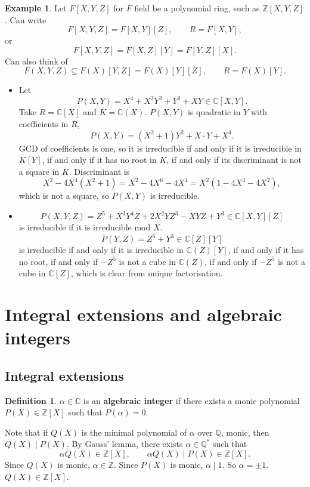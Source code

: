 \documentclass{article}
\newcommand{\Z}{\mathbb{Z}}
\newcommand{\Q}{\mathbb{Q}}
\newcommand{\C}{\mathbb{C}}
\newcommand{\rb}[1]{\left( #1 \right)}
\renewcommand{\sb}[1]{\left[ #1 \right]}
\theoremstyle{definition}\newtheorem{definition}{Definition}[subsection]
\theoremstyle{definition}\newtheorem{remark}[definition]{Remark}
\theoremstyle{definition}\newtheorem*{example}{Example}
\theoremstyle{definition}\newtheorem*{note}{Note}
\begin{document}
\begin{example}
Let $ F\sb{X, Y, Z} $ for $ F $ field be a polynomial ring, such as $ \Z\sb{X, Y, Z} $. Can write
$$ F\sb{X, Y, Z} = F\sb{X, Y}\sb{Z}, \qquad R = F\sb{X, Y}, $$
or
$$ F\sb{X, Y, Z} = F\sb{X, Z}\sb{Y} = F\sb{Y, Z}\sb{X}. $$
Can also think of
$$ F\rb{X, Y, Z} \subseteq F\rb{X}\sb{Y, Z} = F\rb{X}\sb{Y}\sb{Z}, \qquad R = F\rb{X}\sb{Y}. $$
\begin{itemize}
\item Let
$$ P\rb{X, Y} = X^4 + X^2Y^2 + Y^2 + XY \in \C\sb{X, Y}. $$
Take $ R = \C\sb{X} $ and $ K = \C\rb{X} $. $ P\rb{X, Y} $ is quadratic in $ Y $ with coefficients in $ R $,
$$ P\rb{X, Y} = \rb{X^2 + 1}Y^2 + X \cdot Y + X^4. $$
GCD of coefficients is one, so it is irreducible if and only if it is irreducible in $ K\sb{Y} $, if and only if it has no root in $ K $, if and only if its discriminant is not a square in $ K $. Discriminant is
$$ X^2 - 4X^4\rb{X^2 + 1} = X^2 - 4X^6 - 4X^4 = X^2\rb{1 - 4X^4 - 4X^2}, $$
which is not a square, so $ P\rb{X, Y} $ is irreducible.
\item $$ P\rb{X, Y, Z} = Z^5 + X^3Y^4Z + 2X^2YZ^3 - XYZ + Y^3 \in \C\sb{X, Y}\sb{Z} $$
is irreducible if it is irreducible mod $ X $.
$$ \overline{P}\rb{Y, Z} = Z^5 + Y^3 \in \C\sb{Z}\sb{Y} $$
is irreducible if and only if it is irreducible in $ \C\rb{Z}\sb{Y} $, if and only if it has no root, if and only if $ -Z^5 $ is not a cube in $ \C\rb{Z} $, if and only if $ -Z^5 $ is not a cube in $ \C\sb{Z} $, which is clear from unique factorisation.
\end{itemize}
\end{example}

\pagebreak

\section{Integral extensions and algebraic integers}

\subsection{Integral extensions}

\begin{definition}
$ \alpha \in \C $ is an \textbf{algebraic integer} if there exists a monic polynomial $ P\rb{X} \in \Z\sb{X} $ such that $ P\rb{\alpha} = 0 $.
\end{definition}

Note that if $ Q\rb{X} $ is the minimal polynomial of $ \alpha $ over $ \Q $, monic, then $ Q\rb{X} \mid P\rb{X} $. By Gauss' lemma, there exists $ \alpha \in \Q^* $ such that
$$ \alpha Q\rb{X} \in \Z\sb{X}, \qquad \alpha Q\rb{X} \mid P\rb{X} \in \Z\sb{X}. $$
Since $ Q\rb{X} $ is monic, $ \alpha \in \Z $. Since $ P\rb{X} $ is monic, $ \alpha \mid 1 $. So $ \alpha = \pm 1 $. $ Q\rb{X} \in \Z\sb{X} $.
\end{document}
